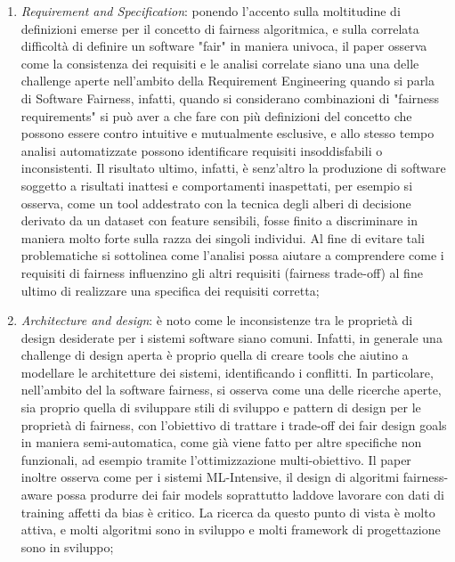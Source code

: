 \begin{enumerate}
    \item \emph{Requirement and Specification}: ponendo l'accento sulla moltitudine di definizioni emerse per il concetto di fairness algoritmica, e sulla correlata difficoltà di definire un software "fair" in maniera univoca, il paper osserva come la consistenza dei requisiti e le analisi correlate siano una una delle challenge aperte nell'ambito della Requirement Engineering quando si parla di Software Fairness, infatti, quando si considerano combinazioni di "fairness requirements" si può aver a che fare con più definizioni del concetto che possono essere contro intuitive e mutualmente esclusive, e allo stesso tempo analisi automatizzate possono identificare requisiti insoddisfabili o inconsistenti. Il risultato ultimo, infatti, è senz'altro la produzione di software soggetto a risultati inattesi e comportamenti inaspettati, per esempio si osserva, come un tool addestrato con la tecnica degli alberi di decisione derivato da un dataset con feature sensibili, fosse finito a discriminare in maniera molto forte sulla razza dei singoli individui. Al fine di evitare tali problematiche si sottolinea come l'analisi possa aiutare a comprendere come i requisiti di fairness influenzino gli altri requisiti (fairness trade-off) al fine ultimo di realizzare una specifica dei requisiti corretta;
    \item \emph{Architecture and design}: è noto come le inconsistenze tra le proprietà di design desiderate per i sistemi software siano comuni. Infatti, in generale una challenge di design aperta è proprio quella di creare tools che aiutino a modellare le architetture dei sistemi, identificando i conflitti. In particolare, nell'ambito del la software fairness, si osserva come una delle ricerche aperte, sia proprio quella di sviluppare stili di sviluppo e pattern di design per le proprietà di fairness, con l'obiettivo di trattare i trade-off dei fair design goals  in maniera semi-automatica, come già viene fatto per altre specifiche non funzionali, ad esempio tramite l'ottimizzazione multi-obiettivo. Il paper inoltre osserva come  per i sistemi ML-Intensive, il design di algoritmi fairness-aware possa produrre dei fair models soprattutto laddove lavorare con dati di training affetti da bias è critico. La ricerca da questo punto di vista è molto attiva, e molti algoritmi sono in sviluppo e molti framework di progettazione sono in sviluppo;
    

\end{enumerate}
